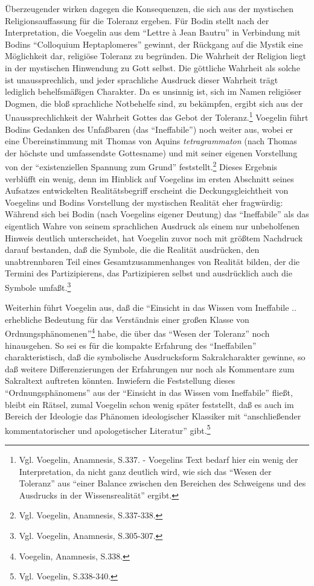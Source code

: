 Überzeugender wirken dagegen die Konsequenzen, die sich aus der
mystischen Religionsauffassung für die Toleranz ergeben. Für Bodin
stellt nach der Interpretation, die Voegelin aus dem "`Lettre à Jean
Bautru"' in Verbindung mit Bodins "`Colloquium Heptaplomeres"' gewinnt,
der Rückgang auf die Mystik eine Möglichkeit dar, religiöse Toleranz zu
begründen. Die Wahrheit der Religion liegt in der mystischen Hinwendung
zu Gott selbst. Die göttliche Wahrheit als solche ist unaussprechlich,
und jeder sprachliche Ausdruck dieser Wahrheit trägt lediglich
behelfsmäßigen Charakter. Da es unsinnig ist, sich im Namen religiöser
Dogmen, die bloß sprachliche Notbehelfe sind, zu bekämpfen, ergibt sich
aus der Unaussprechlichkeit der Wahrheit Gottes das Gebot der
Toleranz.\footnote{Vgl. Voegelin, Anamnesis, S.337. - Voegelins Text
  bedarf hier ein wenig der Interpretation, da nicht ganz deutlich wird,
  wie sich das "`Wesen der Toleranz"' aus "`einer Balance zwischen den
  Bereichen des Schweigens und des Ausdrucks in der Wissensrealität"'
  ergibt.} Voegelin führt Bodins Gedanken des Unfaßbaren (das
"`Ineffabile"') noch weiter aus, wobei er eine Übereinstimmung mit
Thomas von Aquins {\it tetragrammaton} (nach Thomas der höchste und
umfassendste Gottesname) und mit seiner eigenen Vorstellung von der
"`existenziellen Spannung zum Grund"' feststellt.\footnote{Vgl.
  Voegelin, Anamnesis, S.337-338.} Dieses Ergebnis verblüfft ein wenig,
denn im Hinblick auf Voegelins im ersten Abschnitt seines Aufsatzes
entwickelten Realitätsbegriff erscheint die Deckungsgleichtheit von
Voegelins und Bodins Vorstellung der mystischen Realität eher
fragwürdig: Während sich bei Bodin (nach Voegelins eigener Deutung) das
"`Ineffabile"' als das eigentlich Wahre von seinem sprachlichen Ausdruck
als einem nur unbeholfenen Hinweis deutlich unterscheidet, hat Voegelin
zuvor noch mit größtem Nachdruck darauf bestanden, daß die Symbole, die
die Realität ausdrücken, den unabtrennbaren Teil eines
Gesamtzusammenhanges von Realität bilden, der die Termini des
Partizipierens, das Partizipieren selbst und ausdrücklich auch die
Symbole umfaßt.\footnote{Vgl. Voegelin, Anamnesis, S.305-307.}

Weiterhin führt Voegelin aus, daß die "`Einsicht in das Wissen vom Ineffabile
.. erhebliche Bedeutung für das Verständnis einer großen Klasse von
Ordnungsphänomenen"'\footnote{Voegelin, Anamnesis, S.338.} habe, die über das
"`Wesen der Toleranz"' noch hinausgehen. So sei es für die kompakte Erfahrung
des "`Ineffabilen"' charakteristisch, daß die symbolische Ausdrucksform
Sakralcharakter gewinne, so daß weitere Differenzierungen der Erfahrungen nur
noch als Kommentare zum Sakraltext auftreten könnten. Inwiefern die
Feststellung dieses "`Ordnungsphänomens"' aus der "`Einsicht in das Wissen vom
Ineffabile"' fließt, bleibt ein Rätsel, zumal Voegelin schon
wenig später feststellt, daß es auch im Bereich der Ideologie das Phänomen
ideologischer Klassiker mit "`anschließender kommentatorischer und
apologetischer Literatur"' gibt.\footnote{Vgl. Voegelin, S.338-340.}

